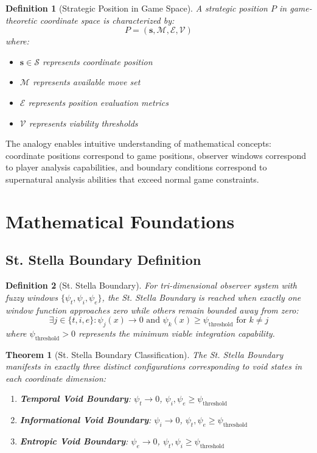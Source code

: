 \documentclass[12pt,a4paper]{article}
\newtheorem{theorem}{Theorem}
\newtheorem{definition}{Definition}
\begin{document}
\begin{definition}[Strategic Position in Game Space]
A strategic position $P$ in game-theoretic coordinate space is characterized by:
\begin{equation}
P = (\mathbf{s}, \mathcal{M}, \mathcal{E}, \mathcal{V})
\end{equation}
where:
\begin{itemize}
\item $\mathbf{s} \in \mathcal{S}$ represents coordinate position
\item $\mathcal{M}$ represents available move set
\item $\mathcal{E}$ represents position evaluation metrics
\item $\mathcal{V}$ represents viability thresholds
\end{itemize}
\end{definition}

The analogy enables intuitive understanding of mathematical concepts: coordinate positions correspond to game positions, observer windows correspond to player analysis capabilities, and boundary conditions correspond to supernatural analysis abilities that exceed normal game constraints.

\section{Mathematical Foundations}

\subsection{St. Stella Boundary Definition}

\begin{definition}[St. Stella Boundary]
For tri-dimensional observer system with fuzzy windows $\{\psi_t, \psi_i, \psi_e\}$, the St. Stella Boundary is reached when exactly one window function approaches zero while others remain bounded away from zero:
\begin{equation}
\exists j \in \{t,i,e\} : \psi_j(x) \to 0 \text{ and } \psi_k(x) \geq \psi_{\text{threshold}} \text{ for } k \neq j
\end{equation}
where $\psi_{\text{threshold}} > 0$ represents the minimum viable integration capability.
\end{definition}

\begin{theorem}[St. Stella Boundary Classification]
The St. Stella Boundary manifests in exactly three distinct configurations corresponding to void states in each coordinate dimension:
\begin{enumerate}
\item \textbf{Temporal Void Boundary}: $\psi_t \to 0$, $\psi_i, \psi_e \geq \psi_{\text{threshold}}$
\item \textbf{Informational Void Boundary}: $\psi_i \to 0$, $\psi_t, \psi_e \geq \psi_{\text{threshold}}$
\item \textbf{Entropic Void Boundary}: $\psi_e \to 0$, $\psi_t, \psi_i \geq \psi_{\text{threshold}}$
\end{enumerate}
\end{theorem}
\end{document}
